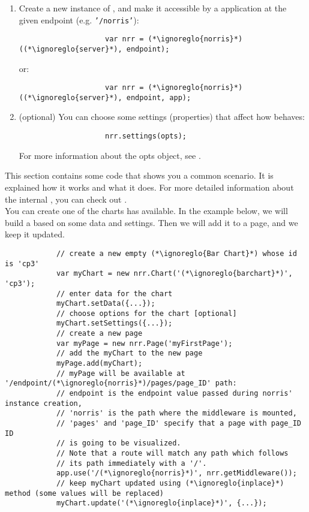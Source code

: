 \begin{itemize}
\begin{enumerate}
				\begin{lstlisting}
					var (*\ignoreglo{norris}*) = require('(*\ignoreglo{norris}*)');
				\end{lstlisting}
				\item Create a new instance of , and make it accessible by a  application at the given endpoint (e.g. \texttt{'/norris'}):
				\begin{lstlisting}
					var nrr = (*\ignoreglo{norris}*)((*\ignoreglo{server}*), endpoint);
				\end{lstlisting}
				or:
				\begin{lstlisting}
					var nrr = (*\ignoreglo{norris}*)((*\ignoreglo{server}*), endpoint, app);
				\end{lstlisting}
				\item (optional) You can choose some settings (properties) that affect how  behaves:
				\begin{lstlisting}
					nrr.settings(opts);
				\end{lstlisting}
				For more information about the opts object, see .
			\end{enumerate}
		\end{itemize}
		This section contains some code that shows you a common scenario. It is explained how it works and what it does. For more detailed information about the internal , you can check out .\\
		You can create one of the charts  has available. In the example below, we will build a  based on some data and settings. Then we will add it to a page, and we keep it updated.
		\begin{lstlisting}
			// create a new empty (*\ignoreglo{Bar Chart}*) whose id is 'cp3'
			var myChart = new nrr.Chart('(*\ignoreglo{barchart}*)', 'cp3');
			// enter data for the chart
			myChart.setData({...});
			// choose options for the chart [optional]
			myChart.setSettings({...});
			// create a new page
			var myPage = new nrr.Page('myFirstPage');
			// add the myChart to the new page
			myPage.add(myChart);
			// myPage will be available at '/endpoint/(*\ignoreglo{norris}*)/pages/page_ID' path:
			// endpoint is the endpoint value passed during norris' instance creation,
			// 'norris' is the path where the middleware is mounted, 
			// 'pages' and 'page_ID' specify that a page with page_ID ID 
			// is going to be visualized. 
			// Note that a route will match any path which follows 
			// its path immediately with a '/'.
			app.use('/(*\ignoreglo{norris}*)', nrr.getMiddleware());
			// keep myChart updated using (*\ignoreglo{inplace}*) method (some values will be replaced)
			myChart.update('(*\ignoreglo{inplace}*)', {...});
		\end{lstlisting}
